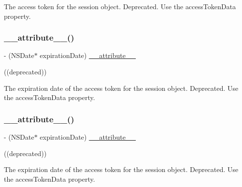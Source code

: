 The access token for the session object.  Deprecated. Use the {\ttfamily access\+Token\+Data} property. \mbox{\label{interfaceFBSession_a42e6a02db4caa8197e8fc851bc18f1e1}} 
\subsubsection{\texorpdfstring{\+\_\+\+\_\+attribute\+\_\+\+\_\+()}{\_\_attribute\_\_()}\hspace{0.1cm}{\footnotesize\ttfamily [6/25]}}
{\footnotesize\ttfamily -\/ (N\+S\+Date$\ast$ expiration\+Date) \hyperlink{struct____attribute____}{\+\_\+\+\_\+attribute\+\_\+\+\_\+} \begin{DoxyParamCaption}\item[{((deprecated))}]{ }\end{DoxyParamCaption}}

The expiration date of the access token for the session object.  Deprecated. Use the {\ttfamily access\+Token\+Data} property. \mbox{\label{interfaceFBSession_a42e6a02db4caa8197e8fc851bc18f1e1}} 
\subsubsection{\texorpdfstring{\+\_\+\+\_\+attribute\+\_\+\+\_\+()}{\_\_attribute\_\_()}\hspace{0.1cm}{\footnotesize\ttfamily [7/25]}}
{\footnotesize\ttfamily -\/ (N\+S\+Date$\ast$ expiration\+Date) \hyperlink{struct____attribute____}{\+\_\+\+\_\+attribute\+\_\+\+\_\+} \begin{DoxyParamCaption}\item[{((deprecated))}]{ }\end{DoxyParamCaption}}

The expiration date of the access token for the session object.  Deprecated. Use the {\ttfamily access\+Token\+Data} property. \mbox{\label{interfaceFBSession_a42e6a02db4caa8197e8fc851bc18f1e1}} 
